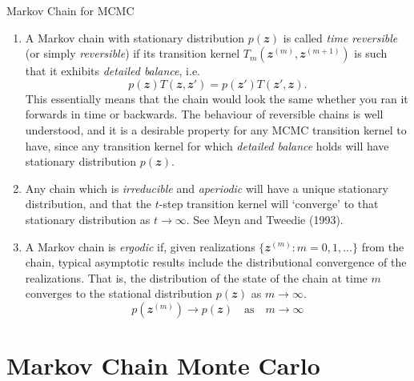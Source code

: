\documentclass{bredelebeamer}
\begin{document}
\begin{frame}{Markov Chain for MCMC\cite{MCMC:1998:RSS}}
  \begin{enumerate}
    \item A Markov chain with stationary distribution $p(\mathbfit{z})$ is
    called \textit{time reversible} (or simply \textit{reversible}) if its
    transition kernel $T_m(\mathbfit{z}^{(m)},\mathbfit{z}^{(m+1)})$ is
    such that it exhibits \textit{detailed balance}, i.e.
    \begin{equation}
      p(\mathbfit{z}) T(\mathbfit{z},\mathbfit{z}')
      = p(\mathbfit{z}') T(\mathbfit{z}',\mathbfit{z}).
    \end{equation}
    This essentially means that the chain would look the same whether you
    ran it forwards in time or backwards. The behaviour of reversible chains
    is well understood, and it is a desirable property for any MCMC transition
    kernel to have, since any transition kernel for which \textit{detailed balance}
    holds will have stationary distribution $p(\mathbfit{z})$.

    \item Any chain which is \textit{irreducible} and \textit{aperiodic} will
    have a unique stationary distribution, and that the $t$-step transition
    kernel will `converge' to that stationary distribution as $t \rightarrow \infty$.
    See Meyn and Tweedie (1993).

    \item A Markov chain is \textit{ergodic} if,
    given realizations ${\{ \mathbfit{z}^{(m)}: m = 0, 1, \ldots \}}$
    from the chain, typical asymptotic results include the distributional
    convergence of the realizations. That is, the distribution of the state
    of the chain at time $m$ converges to the stational distribution
    $p(\mathbfit{z})$ as $m \rightarrow \infty$.
    \begin{equation}
      p(\mathbfit{z}^{(m)}) \rightarrow p(\mathbfit{z})
      \quad \textrm{as} \quad
      m \rightarrow \infty
    \end{equation}
  \end{enumerate}
\end{frame}

\section{Markov Chain Monte Carlo}
\end{document}
